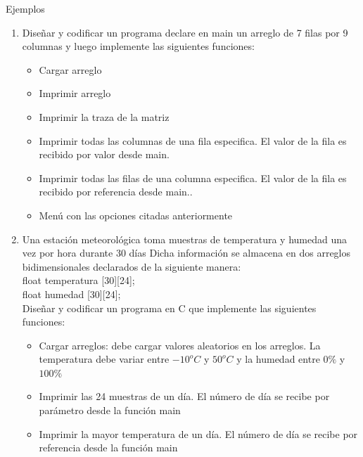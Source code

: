\documentclass[xcolor=pdftex,table,11pt]{beamer}
\begin{document}
\begin{frame}[allowframebreaks]{Ejemplos}
 \begin{enumerate}
   
     \item Diseñar y codificar un programa declare en main un arreglo de 7 filas por 9 columnas y luego implemente las siguientes funciones:
      \begin{itemize}
      
   
     \item Cargar arreglo
     \item Imprimir arreglo
     \item Imprimir la traza de la matriz
	 \item Imprimir todas las columnas de una fila especifica. El valor de la fila es recibido por valor desde main.
	 \item Imprimir todas las filas de una columna especifica. El valor de la fila es recibido por referencia desde main..
	 \item Menú con las opciones citadas anteriormente
     
      \end{itemize}
\href{https://github.com/danis963/informaticaI_IUA/blob/main/c/src/7-funcion_triangulo.c}{}

\newpage

     \item Una estación meteorológica toma muestras de temperatura y humedad una vez por hora durante 30 días Dicha información se almacena en dos arreglos bidimensionales declarados de la siguiente manera: \\
      \vspace{0.35cm}
     float temperatura [30][24]; \\    
     float humedad [30][24];\\  
     

    \vspace{0.5cm}
Diseñar y codificar un programa en C que implemente las siguientes funciones:
      \begin{itemize}
      
   
     \item Cargar arreglos: debe cargar valores aleatorios en los  arreglos. La temperatura debe variar entre $-10^o C$ y $50 ^o C$ y la humedad entre  $0\%$ y $100 \%$ 
     \item Imprimir las 24 muestras de un día. El número de día se recibe por parámetro desde la función main
     \item Imprimir la mayor temperatura de un día. El número de día se recibe por referencia desde la función main
     

\end{itemize}
\end{enumerate}
\end{frame}
\end{document}
